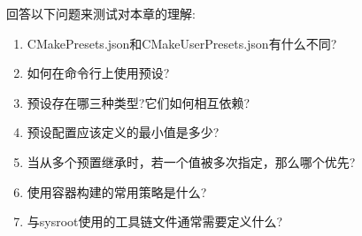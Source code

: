 回答以下问题来测试对本章的理解:

\begin{enumerate}
\item 
CMakePresets.json和CMakeUserPresets.json有什么不同?

\item 
如何在命令行上使用预设?

\item 
预设存在哪三种类型?它们如何相互依赖?

\item 
预设配置应该定义的最小值是多少?

\item 
当从多个预置继承时，若一个值被多次指定，那么哪个优先?

\item 
使用容器构建的常用策略是什么?

\item 
与sysroot使用的工具链文件通常需要定义什么?
\end{enumerate}